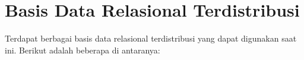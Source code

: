 \section{Basis Data Relasional Terdistribusi}

Terdapat berbagai basis data relasional terdistribusi yang dapat digunakan saat ini. Berikut adalah beberapa di antaranya:



